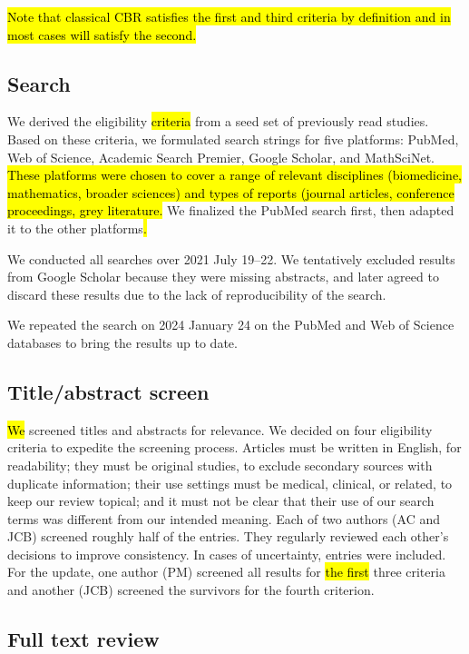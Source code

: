 \documentclass[sn-mathphys,Numbered,pdflatex]{sn-jnl}
\theoremstyle{remark}
\theoremstyle{definition}
\begin{document}
\hl{Note that classical CBR satisfies the first and third criteria by definition and in most cases will satisfy the second.}

\subsection{Search}\label{search}

We derived the eligibility \hl{criteria }from a seed set of previously
read studies. Based on these criteria, we formulated search strings for
five platforms: PubMed, Web of Science, Academic Search Premier, Google
Scholar, and MathSciNet.
\hl{These platforms were chosen to cover a range of relevant disciplines (biomedicine, mathematics, broader sciences) and types of reports (journal articles, conference proceedings, grey literature.}
We finalized the PubMed search first, then adapted it to the other
platforms\hl{.}

We conducted all searches over 2021 July 19--22. We tentatively excluded
results from Google Scholar because they were missing abstracts, and
later agreed to discard these results due to the lack of reproducibility
of the search.

We repeated the search on 2024 January 24 on the PubMed and Web of
Science databases to bring the results up to date.

\subsection{Title/abstract screen}\label{titleabstract-screen}

\hl{We} screened titles and abstracts for relevance. We decided on four
eligibility criteria to expedite the screening process. Articles must be
written in English, for readability; they must be original studies, to
exclude secondary sources with duplicate information; their use settings
must be medical, clinical, or related, to keep our review topical; and
it must not be clear that their use of our search terms was different
from our intended meaning. Each of two authors (AC and JCB) screened
roughly half of the entries. They regularly reviewed each other's
decisions to improve consistency. In cases of uncertainty, entries were
included. For the update, one author (PM) screened all results for
\hl{the first }three criteria and another (JCB) screened the survivors
for the fourth criterion.

\subsection{Full text review}\label{full-text-review}
\end{document}
